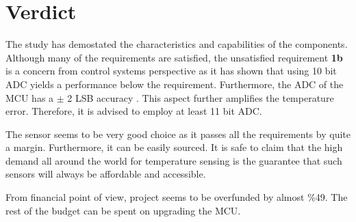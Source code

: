 \section*{Verdict}

The study has demostated the characteristics and capabilities of the components. Although many of the requirements are satisfied, the unsatisfied requirement \textbf{1b} is a concern from control systems perspective as it has shown that using 10 bit ADC yields a performance below the requirement. Furthermore, the ADC of the MCU has a $\pm$ 2 LSB accuracy \cite{ATMEGA328PB}. This aspect further amplifies the temperature error. Therefore, it is advised to employ at least 11 bit ADC.

The sensor seems to be very good choice as it passes all the requirements by quite a margin. Furthermore, it can be easily sourced. It is safe to claim that the high demand all around the world for temperature sensing is the guarantee that such sensors will always be affordable and accessible.

From financial point of view, project seems to be overfunded by almost \%49. The rest of the budget can be spent on upgrading the MCU.